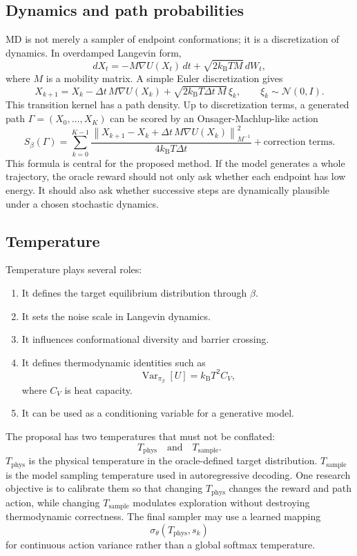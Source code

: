 \documentclass[11pt]{article}
\newcommand{\Kb}{k_{\mathrm B}}
\begin{document}
\subsection{Dynamics and path probabilities}

MD is not merely a sampler of endpoint conformations; it is a discretization of dynamics. In overdamped Langevin form,
\[
dX_t = -M\nabla U(X_t)\,dt + \sqrt{2\Kb T M}\,dW_t,
\]
where $M$ is a mobility matrix. A simple Euler discretization gives
\[
X_{k+1}=X_k - \Delta t\,M\nabla U(X_k)
 + \sqrt{2\Kb T\Delta t\,M}\,\xi_k,\qquad \xi_k\sim\mathcal{N}(0,I).
\]
This transition kernel has a path density. Up to discretization terms, a generated path $\Gamma=(X_0,\dots,X_K)$ can be scored by an Onsager-Machlup-like action
\[
S_\beta(\Gamma)
=
\sum_{k=0}^{K-1}
\frac{
\left\|X_{k+1}-X_k+\Delta t\,M\nabla U(X_k)\right\|^2_{M^{-1}}
}{
4\Kb T\Delta t
}
 + \text{correction terms}.
\]
This formula is central for the proposed method. If the model generates a whole trajectory, the oracle reward should not only ask whether each endpoint has low energy. It should also ask whether successive steps are dynamically plausible under a chosen stochastic dynamics.

\subsection{Temperature}

Temperature plays several roles:
\begin{enumerate}[leftmargin=2em]
  \item It defines the target equilibrium distribution through $\beta$.
  \item It sets the noise scale in Langevin dynamics.
  \item It influences conformational diversity and barrier crossing.
  \item It defines thermodynamic identities such as
  \[
  \operatorname{Var}_{\pi_\beta}[U]=\Kb T^2 C_V,
  \]
  where $C_V$ is heat capacity.
  \item It can be used as a conditioning variable for a generative model.
\end{enumerate}

The proposal has two temperatures that must not be conflated:
\[
T_{\mathrm{phys}}\quad\text{and}\quad T_{\mathrm{sample}}.
\]
$T_{\mathrm{phys}}$ is the physical temperature in the oracle-defined target distribution. $T_{\mathrm{sample}}$ is the model sampling temperature used in autoregressive decoding. One research objective is to calibrate them so that changing $T_{\mathrm{phys}}$ changes the reward and path action, while changing $T_{\mathrm{sample}}$ modulates exploration without destroying thermodynamic correctness. The final sampler may use a learned mapping
\[
\sigma_\theta(T_{\mathrm{phys}},s_k)
\]
for continuous action variance rather than a global softmax temperature.
\end{document}
